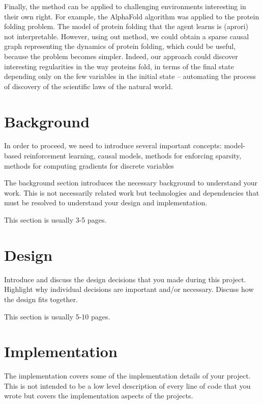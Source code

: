 \documentclass[a4paper,11pt,oneside]{report}
\begin{document}
Finally, the method can be applied to challenging environments interesting in their own right. For example, the AlphaFold algorithm was applied to the protein folding problem. The model of protein folding that the agent learns is (aprori) not interpretable. However, using out method, we could obtain a sparse causal graph representing the dynamics of protein folding, which could be useful, because the problem becomes simpler. Indeed, our approach could discover interesting regularities in the way proteins fold, in terms of the final state depending only on the few variables in the initial state -- automating the process of discovery of the scientific laws of the natural world.

\chapter{Background}

In order to proceed, we need to introduce several important concepts: model-based reinforcement learning, causal models, methods for enforcing sparsity, methods for computing gradients for discrete variables

The background section introduces the necessary background to understand your
work. This is not necessarily related work but technologies and dependencies
that must be resolved to understand your design and implementation.

This section is usually 3-5 pages.


\chapter{Design}

Introduce and discuss the design decisions that you made during this project.
Highlight why individual decisions are important and/or necessary. Discuss
how the design fits together.

This section is usually 5-10 pages.


\chapter{Implementation}

The implementation covers some of the implementation details of your project.
This is not intended to be a low level description of every line of code that
you wrote but covers the implementation aspects of the projects.
\end{document}
